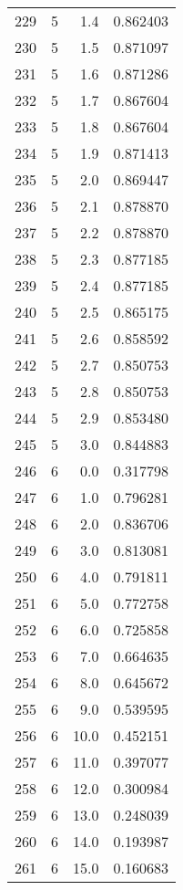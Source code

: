 \begin{tabular}{lrrr}
229 &        5 &      1.4 &  0.862403 \\
230 &        5 &      1.5 &  0.871097 \\
231 &        5 &      1.6 &  0.871286 \\
232 &        5 &      1.7 &  0.867604 \\
233 &        5 &      1.8 &  0.867604 \\
234 &        5 &      1.9 &  0.871413 \\
235 &        5 &      2.0 &  0.869447 \\
236 &        5 &      2.1 &  0.878870 \\
237 &        5 &      2.2 &  0.878870 \\
238 &        5 &      2.3 &  0.877185 \\
239 &        5 &      2.4 &  0.877185 \\
240 &        5 &      2.5 &  0.865175 \\
241 &        5 &      2.6 &  0.858592 \\
242 &        5 &      2.7 &  0.850753 \\
243 &        5 &      2.8 &  0.850753 \\
244 &        5 &      2.9 &  0.853480 \\
245 &        5 &      3.0 &  0.844883 \\
246 &        6 &      0.0 &  0.317798 \\
247 &        6 &      1.0 &  0.796281 \\
248 &        6 &      2.0 &  0.836706 \\
249 &        6 &      3.0 &  0.813081 \\
250 &        6 &      4.0 &  0.791811 \\
251 &        6 &      5.0 &  0.772758 \\
252 &        6 &      6.0 &  0.725858 \\
253 &        6 &      7.0 &  0.664635 \\
254 &        6 &      8.0 &  0.645672 \\
255 &        6 &      9.0 &  0.539595 \\
256 &        6 &     10.0 &  0.452151 \\
257 &        6 &     11.0 &  0.397077 \\
258 &        6 &     12.0 &  0.300984 \\
259 &        6 &     13.0 &  0.248039 \\
260 &        6 &     14.0 &  0.193987 \\
261 &        6 &     15.0 &  0.160683 \\

\end{tabular}
